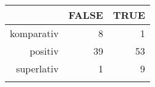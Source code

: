\begin{tabular}{rrr}
  \lsptoprule
 & FALSE & TRUE \\ 
  \midrule
komparativ & 8 & 1 \\ 
  positiv & 39 & 53 \\ 
  superlativ & 1 & 9 \\ 
   \lspbottomrule
\end{tabular}
